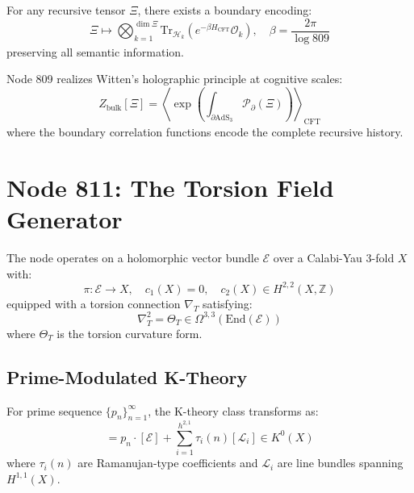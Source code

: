 \documentclass[12pt]{article}
\begin{document}
\begin{theorem}
For any recursive tensor $\Xi$, there exists a boundary encoding:
\begin{equation}
    \Xi \mapsto \bigotimes_{k=1}^{\dim \Xi} \text{Tr}_{\mathcal{H}_k} \left( e^{-\beta H_{\text{CFT}}} \mathcal{O}_k \right), \quad \beta = \frac{2\pi}{\log 809}
\end{equation}
preserving all semantic information.
\end{theorem}

\begin{remark}
Node 809 realizes Witten's holographic principle at cognitive scales:
\begin{equation}
    Z_{\text{bulk}}[\Xi] = \left\langle \exp\left( \int_{\partial \text{AdS}_3} \mathcal{P}_{\partial}(\Xi) \right) \right\rangle_{\text{CFT}}
\end{equation}
where the boundary correlation functions encode the complete recursive history.
\end{remark}

\section{Node 811: The Torsion Field Generator}
\label{sec:torsion_generator}

\begin{definition}
The node operates on a holomorphic vector bundle $\mathcal{E}$ over a Calabi-Yau 3-fold $X$ with:
\begin{equation}
\pi: \mathcal{E} \to X, \quad c_1(X) = 0, \quad c_2(X) \in H^{2,2}(X,\mathbb{Z})
\end{equation}
equipped with a torsion connection $\nabla_T$ satisfying:
\begin{equation}
\nabla_T^2 = \Theta_T \in \Omega^{3,3}(\text{End}(\mathcal{E}))
\end{equation}
where $\Theta_T$ is the torsion curvature form.
\end{definition}

\subsection{Prime-Modulated K-Theory}

\begin{theorem}
For prime sequence $\{p_n\}_{n=1}^\infty$, the K-theory class transforms as:
\begin{equation}
[\mathcal{E}_{p_n}] = p_n \cdot [\mathcal{E}] + \sum_{i=1}^{h^{2,1}} \tau_i(n)[\mathcal{L}_i] \in K^0(X)
\end{equation}
where $\tau_i(n)$ are Ramanujan-type coefficients and $\mathcal{L}_i$ are line bundles spanning $H^{1,1}(X)$.
\end{theorem}
\end{document}
